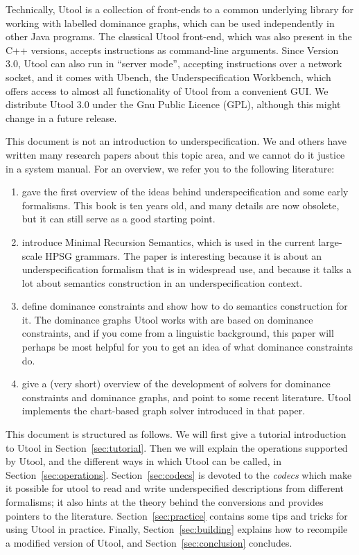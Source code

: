 Technically, Utool is a collection of front-ends to a common
underlying library for working with labelled dominance graphs, which
can be used independently in other Java programs. The classical Utool
front-end, which was also present in the C++ versions, accepts
instructions as command-line arguments. Since Version 3.0, Utool can
also run in ``server mode'', accepting instructions over a network
socket, and it comes with Ubench, the Underspecification Workbench,
which offers access to almost all functionality of Utool from a
convenient GUI. We distribute Utool 3.0 under the Gnu Public Licence
(GPL), although this might change in a future release.

This document is not an introduction to underspecification. We and
others have written many research papers about this topic area, and we
cannot do it justice in a system manual. For an overview, we refer you
to the following literature:
\begin{enumerate}
\item {} gave the first overview of the ideas
behind underspecification and some early formalisms. This book is ten
years old, and many details are now obsolete, but it can still serve
as a good starting point.
\item {} introduce Minimal Recursion Semantics, which
is used in the current large-scale HPSG grammars. The paper is
interesting because it is about an underspecification formalism that
is in widespread use, and because it talks a lot about semantics
construction in an underspecification context.
\item {} define dominance constraints and show how to do
semantics construction for it. The dominance graphs Utool works with
are based on dominance constraints, and if you come from a linguistic
background, this paper will perhaps be most helpful for you to get an
idea of what dominance constraints do.
\item {} give a (very short) overview of the
development of solvers for dominance constraints and dominance graphs,
and point to some recent literature. Utool implements the chart-based
graph solver introduced in that paper.
\end{enumerate}


This document is structured as follows. We will first give a tutorial
introduction to Utool in Section~\ref{sec:tutorial}. Then we will
explain the operations supported by Utool, and the different ways in
which Utool can be called, in
Section~\ref{sec:operations}. Section~\ref{sec:codecs} is devoted to
the \emph{codecs} which make it possible for utool to read and write
underspecified descriptions from different formalisms; it also hints
at the theory behind the conversions and provides pointers to the
literature. Section~\ref{sec:practice} contains some tips and tricks
for using Utool in practice. Finally, Section~\ref{sec:building}
explains how to recompile a modified version of Utool, and
Section~\ref{sec:conclusion} concludes.

